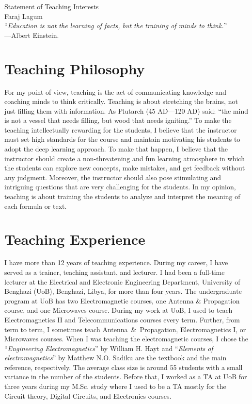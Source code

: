 \documentclass[11pt]{article}
\begin{document}
\begin{center}
{\Large Statement of Teaching Interests} \\[.3in]
{\large Faraj Lagum}\\
\vspace*{.5in}
{``\emph{Education is not the learning of facts, but the training of minds to think.}'' \\ ---Albert Einstein.}
\end{center}


\section{Teaching Philosophy}
For my point of view, teaching is the act of communicating knowledge and coaching minds to think critically. Teaching is about stretching the brains, not just filling them with information. As Plutarch (45 AD---120 AD) said: ``the mind is not a vessel that needs filling, but wood that needs igniting.'' To make the teaching intellectually rewarding for the students, I believe that the instructor must set high standards for the course and maintain motivating his students to adopt the deep learning approach. To make that happen, I believe that the instructor should create a non-threatening and fun learning atmosphere in which the students can explore new concepts, make mistakes, and get feedback without any judgment. Moreover, the instructor should also pose stimulating and intriguing questions that are very challenging for the students. In my opinion, teaching is about training the students to analyze and interpret the meaning of each formula or text. 



\section{Teaching Experience}
I have more than 12 years of teaching experience. During my career, I have served as a trainer, teaching assistant, and lecturer. I had been a full-time lecturer at the Electrical and Electronic Engineering Department, University of Benghazi (UoB), Benghazi, Libya, for more than four years. The undergraduate program at UoB has two Electromagnetic courses, one Antenna \& Propagation course, and one Microwaves course. During my work at UoB, I used to teach Electromagnetics II and Telecommunications courses every term. Further, from term to term, I sometimes teach Antenna~\&~Propagation, Electromagnetics I, or Microwaves courses. When I was teaching the electromagnetic courses, I chose the ``\emph{Engineering Electromagnetics}'' by William H. Hayt and ``\emph{Elements of electromagnetics}'' by Matthew N.O. Sadiku are the textbook and the main reference, respectively. The average class size is around 55 students with a small variance in the number of the students.
Before that, I worked as a TA at UoB for three years during my M.Sc. study where I used to be a TA mostly for the Circuit theory, Digital Circuits, and Electronics courses. 
\end{document}
